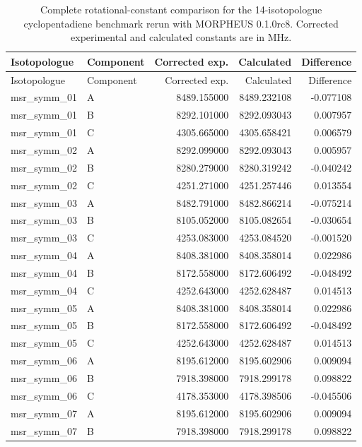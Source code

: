 \begin{longtable}{llrrr}
\caption{Complete rotational-constant comparison for the 14-isotopologue cyclopentadiene benchmark rerun with MORPHEUS 0.1.0rc8. Corrected experimental and calculated constants are in MHz.}\label{tab:si-cyclopentadiene-rotconstants}\\
\toprule
Isotopologue & Component & Corrected exp. & Calculated & Difference \\
\midrule
\endfirsthead
\toprule
Isotopologue & Component & Corrected exp. & Calculated & Difference \\
\midrule
\endhead
msr\_symm\_01 & A & 8489.155000 & 8489.232108 & -0.077108 \\
msr\_symm\_01 & B & 8292.101000 & 8292.093043 & 0.007957 \\
msr\_symm\_01 & C & 4305.665000 & 4305.658421 & 0.006579 \\
msr\_symm\_02 & A & 8292.099000 & 8292.093043 & 0.005957 \\
msr\_symm\_02 & B & 8280.279000 & 8280.319242 & -0.040242 \\
msr\_symm\_02 & C & 4251.271000 & 4251.257446 & 0.013554 \\
msr\_symm\_03 & A & 8482.791000 & 8482.866214 & -0.075214 \\
msr\_symm\_03 & B & 8105.052000 & 8105.082654 & -0.030654 \\
msr\_symm\_03 & C & 4253.083000 & 4253.084520 & -0.001520 \\
msr\_symm\_04 & A & 8408.381000 & 8408.358014 & 0.022986 \\
msr\_symm\_04 & B & 8172.558000 & 8172.606492 & -0.048492 \\
msr\_symm\_04 & C & 4252.643000 & 4252.628487 & 0.014513 \\
msr\_symm\_05 & A & 8408.381000 & 8408.358014 & 0.022986 \\
msr\_symm\_05 & B & 8172.558000 & 8172.606492 & -0.048492 \\
msr\_symm\_05 & C & 4252.643000 & 4252.628487 & 0.014513 \\
msr\_symm\_06 & A & 8195.612000 & 8195.602906 & 0.009094 \\
msr\_symm\_06 & B & 7918.398000 & 7918.299178 & 0.098822 \\
msr\_symm\_06 & C & 4178.353000 & 4178.398506 & -0.045506 \\
msr\_symm\_07 & A & 8195.612000 & 8195.602906 & 0.009094 \\
msr\_symm\_07 & B & 7918.398000 & 7918.299178 & 0.098822 \\

\end{longtable}
